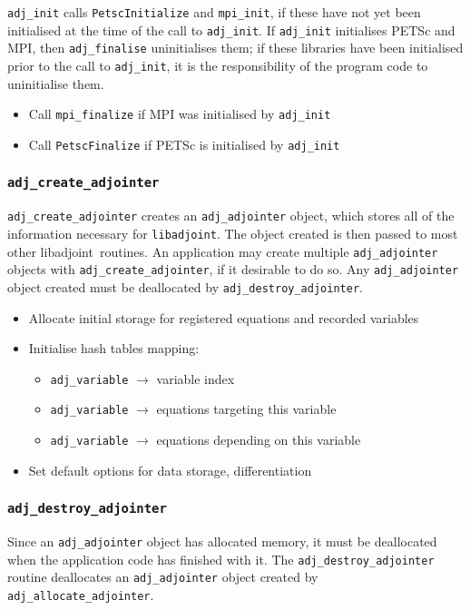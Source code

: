 \documentclass[10pt,authoryear]{elsarticle}
\newcommand{\libadjoint}[0]{{\texttt{libadjoint}}}
\begin{document}
\texttt{adj\_init} calls \texttt{PetscInitialize} and \texttt{mpi\_init}, if these have
not yet been initialised at the time of the call to \texttt{adj\_init}. If \texttt{adj\_init}
initialises PETSc and MPI, then \texttt{adj\_finalise} uninitialises them; if these libraries
have been initialised prior to the call to \texttt{adj\_init}, it is the responsibility of the program
code to uninitialise them.

\begin{itemize}
\item Call \texttt{mpi\_finalize} if MPI was initialised by \texttt{adj\_init}
\item Call \texttt{PetscFinalize} if PETSc is initialised by \texttt{adj\_init}
\end{itemize}

\subsubsection{\texttt{{adj\_create\_adjointer}}}
\texttt{adj\_create\_adjointer} creates an \texttt{adj\_adjointer} object, which stores
all of the information necessary for \libadjoint. The object created is then passed to most other libadjoint\ 
routines. An application may create multiple \texttt{adj\_adjointer} objects with \texttt{adj\_create\_adjointer},
if it desirable to do so. Any \texttt{adj\_adjointer} object created must be deallocated by \texttt{adj\_destroy\_adjointer}.

\begin{itemize}
\item Allocate initial storage for registered equations and recorded variables
\item Initialise hash tables mapping:
  \begin{itemize}
  \item \texttt{adj\_variable} $\rightarrow$ variable index
  \item \texttt{adj\_variable} $\rightarrow$ equations targeting this variable
  \item \texttt{adj\_variable} $\rightarrow$ equations depending on this variable
  \end{itemize}
\item Set default options for data storage, differentiation
\end{itemize}

\subsubsection{\texttt{{adj\_destroy\_adjointer}}}
Since an \texttt{adj\_adjointer} object has allocated memory, it must be deallocated when the application code has finished
with it. The \texttt{adj\_destroy\_adjointer} routine deallocates an \texttt{adj\_adjointer} object created by 
\texttt{adj\_allocate\_adjointer}.
\end{document}
